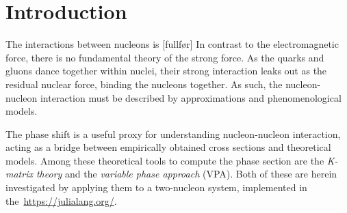 \section{Introduction}
The interactions between nucleons is [fullfør]
In contrast to the electromagnetic force, there is no fundamental theory of the
strong force. As the quarks and gluons dance together within nuclei, their
strong interaction leaks out as the residual nuclear force, binding the nucleons
together. As such, the nucleon-nucleon interaction must be described by
approximations and phenomenological models.

The phase shift is a useful proxy for understanding nucleon-nucleon interaction,
acting as a bridge between empirically obtained cross sections and theoretical
models.
Among these theoretical tools to compute the phase section are the \textit{K-matrix theory} and the \textit{variable
  phase approach} (VPA). Both of these are herein investigated by applying them
to a two-nucleon system, implemented in the~\href{Julia language}{https://julialang.org/}.

